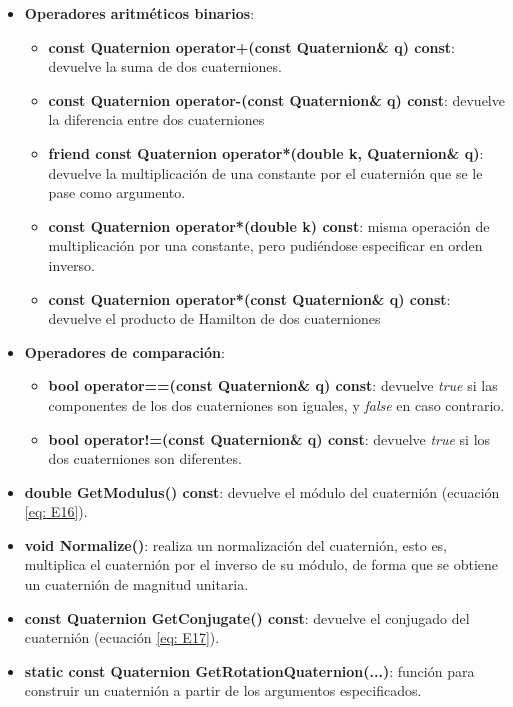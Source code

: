 \documentclass[12pt, a4paper]{report}
\begin{document}
\begin{itemize}
\begin{itemize}
\end{itemize}

\item \textbf{Operadores aritméticos binarios}:

\begin{itemize}
\item \textbf{const Quaternion operator+(const Quaternion\& q) const}: devuelve la suma de dos cuaterniones.
\item \textbf{const Quaternion operator-(const Quaternion\& q) const}: devuelve la diferencia entre dos cuaterniones
\item \textbf{friend const Quaternion operator*(double k, Quaternion\& q)}: devuelve la multiplicación de una constante por el cuaternión que se le pase como argumento.
\item \textbf{const Quaternion operator*(double k) const}: misma operación de multiplicación por una constante, pero pudiéndose especificar en orden inverso.
\item \textbf{const Quaternion operator*(const Quaternion\& q) const}: devuelve el producto de Hamilton de dos cuaterniones 
\end{itemize}

\item \textbf{Operadores de comparación}:

\begin{itemize}
\item \textbf{bool operator==(const Quaternion\& q) const}: devuelve \textit{true} si las componentes de los dos cuaterniones son iguales, y \textit{false} en caso contrario.
\item \textbf{bool operator!=(const Quaternion\& q) const}: devuelve \textit{true} si los dos cuaterniones son diferentes. 
\end{itemize}

\item \textbf{double GetModulus() const}: devuelve el módulo del cuaternión (ecuación \eqref{eq: E16}).
\item \textbf{void Normalize()}: realiza un normalización del cuaternión, esto es, multiplica el cuaternión por el inverso de su módulo, de forma que se obtiene un cuaternión de magnitud unitaria.
\item \textbf{const Quaternion GetConjugate() const}: devuelve el conjugado del cuaternión (ecuación \eqref{eq: E17}).
\item \textbf{static const Quaternion GetRotationQuaternion(...)}: función para construir un cuaternión a partir de los argumentos especificados. 


\end{itemize}
\end{document}
